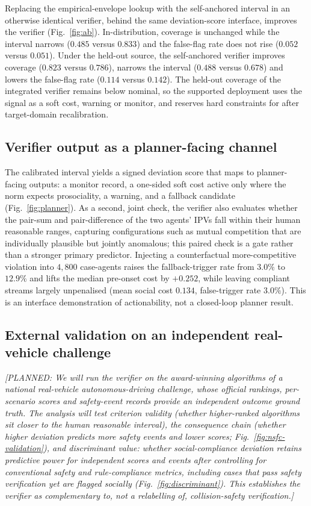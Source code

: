 \documentclass[12pt,a4paper]{article}
\newcommand{\planned}[1]{{\color{blue!60!black}\textit{[PLANNED: #1]}}}
\begin{document}
Replacing the empirical-envelope lookup with the self-anchored interval in an otherwise
identical verifier, behind the same deviation-score interface, improves the verifier
(Fig.~\ref{fig:ab}). In-distribution, coverage is unchanged while the interval narrows
($0.485$ versus $0.833$) and the false-flag rate does not rise ($0.052$ versus $0.051$).
Under the held-out source, the self-anchored verifier improves coverage ($0.823$ versus
$0.786$), narrows the interval ($0.488$ versus $0.678$) and lowers the false-flag rate
($0.114$ versus $0.142$). The held-out coverage of the integrated verifier remains below
nominal, so the supported deployment uses the signal as a soft cost, warning or monitor, and
reserves hard constraints for after target-domain recalibration.

\subsection{Verifier output as a planner-facing channel}
The calibrated interval yields a signed deviation score that maps to planner-facing
outputs: a monitor record, a one-sided soft cost active only where the norm expects
prosociality, a warning, and a fallback candidate (Fig.~\ref{fig:planner}). As a second,
joint check, the verifier also evaluates whether the pair-sum and pair-difference of the two
agents' IPVs fall within their human reasonable ranges, capturing configurations such as
mutual competition that are individually plausible but jointly anomalous; this paired check
is a gate rather than a stronger primary predictor. Injecting a counterfactual
more-competitive violation into $4{,}800$ case-agents raises the fallback-trigger rate from
$3.0\%$ to $12.9\%$ and lifts the median pre-onset cost by $+0.252$, while leaving compliant
streams largely unpenalised (mean social cost $0.134$, false-trigger rate $3.0\%$). This is
an interface demonstration of actionability, not a closed-loop planner result.

\subsection{External validation on an independent real-vehicle challenge}
\planned{We will run the verifier on the award-winning algorithms of a national real-vehicle
autonomous-driving challenge, whose official rankings, per-scenario scores and safety-event
records provide an independent outcome ground truth. The analysis will test criterion
validity (whether higher-ranked algorithms sit closer to the human reasonable interval), the
consequence chain (whether higher deviation predicts more safety events and lower scores;
Fig.~\ref{fig:nsfc-validation}), and discriminant value: whether social-compliance deviation
retains predictive power for independent scores and events after controlling for
conventional safety and rule-compliance metrics, including cases that pass safety
verification yet are flagged socially (Fig.~\ref{fig:discriminant}). This establishes the
verifier as complementary to, not a relabelling of, collision-safety verification.}
\end{document}
